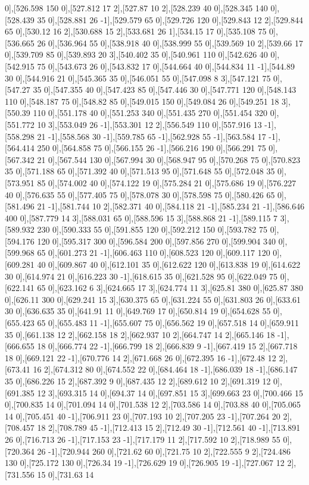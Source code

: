 {0],[526.598 150 0],[527.812 17 2],[527.87 10 2],[528.239 40 0],[528.345 140 0],[528.439 35 0],[528.881 26 -1],[529.579 65 0],[529.726 120 0],[529.843 12 2],[529.844 65 0],[530.12 16 2],[530.688 15 2],[533.681 26 1],[534.15 17 0],[535.108 75 0],[536.665 26 0],[536.964 55 0],[538.918 40 0],[538.999 55 0],[539.569 10 2],[539.66 17 0],[539.709 85 0],[539.893 20 3],[540.402 35 0],[540.961 110 0],[542.626 40 0],[542.915 75 0],[543.673 26 0],[543.832 17 0],[544.664 40 0],[544.834 11 -1],[544.89 30 0],[544.916 21 0],[545.365 35 0],[546.051 55 0],[547.098 8 3],[547.121 75 0],[547.27 35 0],[547.355 40 0],[547.423 85 0],[547.446 30 0],[547.771 120 0],[548.143 110 0],[548.187 75 0],[548.82 85 0],[549.015 150 0],[549.084 26 0],[549.251 18 3],[550.39 110 0],[551.178 40 0],[551.253 340 0],[551.435 270 0],[551.454 320 0],[551.772 10 3],[553.049 26 -1],[553.301 12 2],[556.549 110 0],[557.916 13 -1],[558.298 21 -1],[558.568 30 -1],[559.785 65 -1],[562.928 55 -1],[563.584 17 -1],[564.414 250 0],[564.858 75 0],[566.155 26 -1],[566.216 190 0],[566.291 75 0],[567.342 21 0],[567.544 130 0],[567.994 30 0],[568.947 95 0],[570.268 75 0],[570.823 35 0],[571.188 65 0],[571.392 40 0],[571.513 95 0],[571.648 55 0],[572.048 35 0],[573.951 85 0],[574.002 40 0],[574.122 19 0],[575.284 21 0],[575.686 19 0],[576.227 40 0],[576.635 55 0],[577.405 75 0],[578.078 30 0],[578.598 75 0],[580.426 65 0],[581.496 21 -1],[581.744 10 2],[582.371 40 0],[584.118 21 -1],[585.234 21 -1],[586.646 400 0],[587.779 14 3],[588.031 65 0],[588.596 15 3],[588.868 21 -1],[589.115 7 3],[589.932 230 0],[590.333 55 0],[591.855 120 0],[592.212 150 0],[593.782 75 0],[594.176 120 0],[595.317 300 0],[596.584 200 0],[597.856 270 0],[599.904 340 0],[599.968 65 0],[601.273 21 -1],[606.463 110 0],[608.523 120 0],[609.117 120 0],[609.281 40 0],[609.867 40 0],[612.101 35 0],[612.622 120 0],[613.838 19 0],[614.622 30 0],[614.974 21 0],[616.223 30 -1],[618.615 35 0],[621.528 95 0],[622.049 75 0],[622.141 65 0],[623.162 6 3],[624.665 17 3],[624.774 11 3],[625.81 380 0],[625.87 380 0],[626.11 300 0],[629.241 15 3],[630.375 65 0],[631.224 55 0],[631.803 26 0],[633.61 30 0],[636.635 35 0],[641.91 11 0],[649.769 17 0],[650.814 19 0],[654.628 55 0],[655.423 65 0],[655.483 11 -1],[655.607 75 0],[656.562 19 0],[657.518 14 0],[659.911 35 0],[661.138 12 2],[662.158 18 2],[662.937 10 2],[664.747 14 2],[665.146 18 -1],[666.655 18 0],[666.774 22 -1],[666.799 18 2],[666.839 9 -1],[667.419 15 2],[667.718 18 0],[669.121 22 -1],[670.776 14 2],[671.668 26 0],[672.395 16 -1],[672.48 12 2],[673.41 16 2],[674.312 80 0],[674.552 22 0],[684.464 18 -1],[686.039 18 -1],[686.147 35 0],[686.226 15 2],[687.392 9 0],[687.435 12 2],[689.612 10 2],[691.319 12 0],[691.385 12 3],[693.315 14 0],[694.37 14 0],[697.851 15 3],[699.663 23 0],[700.466 15 0],[700.835 14 0],[701.094 14 0],[701.538 12 2],[703.586 14 0],[703.88 40 0],[705.065 14 0],[705.451 40 -1],[706.911 23 0],[707.193 10 2],[707.205 23 -1],[707.264 20 2],[708.457 18 2],[708.789 45 -1],[712.413 15 2],[712.49 30 -1],[712.561 40 -1],[713.891 26 0],[716.713 26 -1],[717.153 23 -1],[717.179 11 2],[717.592 10 2],[718.989 55 0],[720.364 26 -1],[720.944 260 0],[721.62 60 0],[721.75 10 2],[722.555 9 2],[724.486 130 0],[725.172 130 0],[726.34 19 -1],[726.629 19 0],[726.905 19 -1],[727.067 12 2],[731.556 15 0],[731.63 14 }
